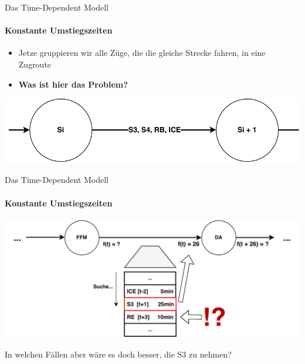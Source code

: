 \begin{frame}{Das Time-Dependent Modell}
	\framesubtitle{Konstante Umstiegszeiten}
	\begin{itemize}
		\item Jetze gruppieren wir alle Züge, die die gleiche Strecke fahren, in eine Zugroute
		\item \textbf{Was ist hier das Problem?}
	\end{itemize}
	
	\begin{center}
		\includegraphics[width=\linewidth]{images/time-dependent/zugroute-problem.pdf}
	\end{center}
\end{frame}


\begin{frame}{Das Time-Dependent Modell}
	\framesubtitle{Konstante Umstiegszeiten}

	\begin{center}
		\includegraphics[width=\linewidth]{images/time-dependent/zugroute-problem-beispiel.pdf}
	\end{center}

	\pause
	\begin{block}{}
		In welchen Fällen aber wäre es doch besser, die S3 zu nehmen?
	\end{block}
\end{frame}


